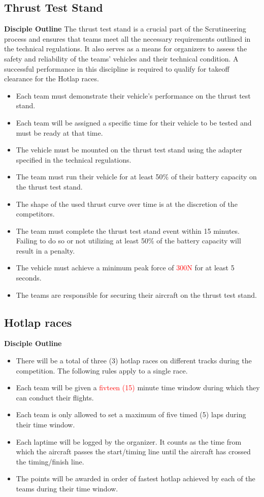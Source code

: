     \subsection{Thrust Test Stand}
    \textbf{Disciple Outline}
    The thrust test stand is a crucial part of the Scrutineering process and ensures that teams meet all the necessary requirements outlined in the technical regulations. It also serves as a means for organizers to assess the safety and reliability of the teams' vehicles and their technical condition. A successful performance in this discipline is required to qualify for takeoff clearance for the Hotlap races.
    \begin{itemize}
      \item Each team must demonstrate their vehicle's performance on the thrust test stand.
      \item Each team will be assigned a specific time for their vehicle to be tested and must be ready at that time.
      \item The vehicle must be mounted on the thrust test stand using the adapter specified in the technical regulations.
      \item The team must run their vehicle for at least 50\% of their battery capacity on the thrust test stand.
      \item The shape of the used thrust curve over time is at the discretion of the competitors.
      \item The team must complete the thrust test stand event within 15 minutes. Failing to do so or not utilizing at least 50\% of the battery capacity will result in a penalty.
      \item The vehicle must achieve a minimum peak force of \textcolor{red}{300N} for at least 5 seconds.
      \item The teams are responsible for securing their aircraft on the thrust test stand.
      \end{itemize}



    \subsection{Hotlap races}
    \textbf{Disciple Outline}
    \begin{itemize}
      \item There will be a total of three (3) hotlap races on different tracks during the competition. The following rules apply to a single race.
      \item Each team will be given a \textcolor{red}{fivteen (15) } minute time window during which they can conduct their flights. 
      \item Each team is only allowed to set a maximum of five timed (5) laps during their time window. 
      \item Each laptime will be logged by the organizer. It counts as the time from which the aircraft passes the start/timing line until the aircraft has crossed the timing/finish line. 
      \item The points will be awarded in order of fastest hotlap achieved by each of the teams during their time window.
    \end{itemize}

